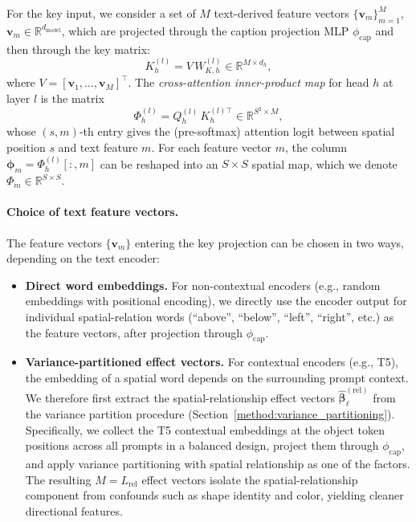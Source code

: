 For the key input, we consider a set of $M$ text-derived feature vectors $\{\mathbf{v}_m\}_{m=1}^M$, $\mathbf{v}_m \in \mathbb{R}^{d_{\mathrm{model}}}$, which are projected through the caption projection MLP $\phi_{\mathrm{cap}}$ and then through the key matrix:
\begin{equation}
    K_h^{(l)} = V \, W_{K,h}^{(l)} \in \mathbb{R}^{M \times d_h},
\end{equation}
where $V = [\mathbf{v}_1, \dots, \mathbf{v}_M]^\top$. The \emph{cross-attention inner-product map} for head $h$ at layer $l$ is the matrix
\begin{equation}
    \Phi_h^{(l)} = Q_h^{(l)} \, K_h^{(l)\top} \in \mathbb{R}^{S^2 \times M},
    \label{eq:inner-product-map}
\end{equation}
whose $(s, m)$-th entry gives the (pre-softmax) attention logit between spatial position $s$ and text feature $m$. For each feature vector $m$, the column $\boldsymbol{\phi}_m = \Phi_h^{(l)}[:,m]$ can be reshaped into an $S \times S$ spatial map, which we denote $\Phi_m \in \mathbb{R}^{S \times S}$.

\paragraph{Choice of text feature vectors.}
The feature vectors $\{\mathbf{v}_m\}$ entering the key projection can be chosen in two ways, depending on the text encoder:

\begin{itemize}
    \item \textbf{Direct word embeddings.} For non-contextual encoders (e.g., random embeddings with positional encoding), we directly use the encoder output for individual spatial-relation words (``above'', ``below'', ``left'', ``right'', etc.) as the feature vectors, after projection through $\phi_{\mathrm{cap}}$.

    \item \textbf{Variance-partitioned effect vectors.} For contextual encoders (e.g., T5), the embedding of a spatial word depends on the surrounding prompt context. We therefore first extract the spatial-relationship effect vectors $\hat{\boldsymbol{\beta}}^{(\mathrm{rel})}_\ell$ from the variance partition procedure (Section~\ref{method:variance_partitioning}). Specifically, we collect the T5 contextual embeddings at the object token positions across all prompts in a balanced design, project them through $\phi_{\mathrm{cap}}$, and apply variance partitioning with spatial relationship as one of the factors. The resulting $M = L_{\mathrm{rel}}$ effect vectors isolate the spatial-relationship component from confounds such as shape identity and color, yielding cleaner directional features.
\end{itemize}

